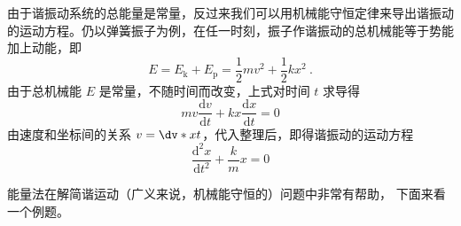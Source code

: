 

由于谐振动系统的总能量是常量，反过来我们可以用机械能守恒定律来导出谐振动的运动方程。仍以弹簧振子为例，在任一时刻，振子作谐振动的总机械能等于势能加上动能，即
\begin{equation}
E=E_{\mathrm k}+E_{\mathrm p}=\frac{1}{2} m v^{2}+\frac{1}{2} k x^{2}~.
\end{equation}
由于总机械能 $E$ 是常量，不随时间而改变，上式对时间 $t$ 求导得
\begin{equation}
m v \frac{\mathrm{d} v}{\mathrm{d} t}+k x \frac{\mathrm{d} x}{\mathrm{d} t}=0
\end{equation}
由速度和坐标间的关系 $v = \dv*{x}{t}$，代入整理后，即得谐振动的运动方程
\begin{equation}
\frac{\mathrm{d}^{2} x}{\mathrm{d} t^{2}}+\frac{k}{m} x=0
\end{equation}

能量法在解简谐运动（广义来说，机械能守恒的）问题中非常有帮助， 下面来看一个例题。 

